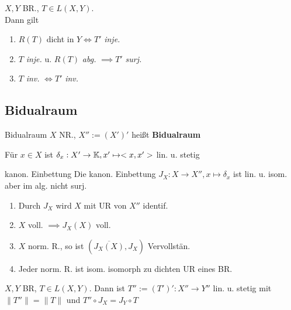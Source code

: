 \begin{bemerkung}
    \(X,Y\) BR., \(T\in L(X,Y)\).\\
    Dann gilt
    \begin{enumerate}[label= (\roman*)]
        \item \(R(T)\) dicht in \(Y \Leftrightarrow T'\) \textit{inje.}
        \item \(T\) \textit{inje.} u. \(R(T)\) \textit{abg.} \(\implies 
            T'\) \textit{surj.}
        \item \(T\) \textit{inv.} \(\Leftrightarrow T'\) \textit{inv.}
    \end{enumerate}
\end{bemerkung}


\subsection{Bidualraum}

\begin{definition}{Bidualraum}
    \(X\) NR., \(X'' := (X')'\) heißt \textbf{Bidualraum}
\end{definition}

\begin{bemerkung}
    Für \(x\in X\) ist \(\delta_x: X' \to \mathbb{K}, x'\mapsto <x,x'>\) lin. u. stetig
\end{bemerkung}

\begin{satz}{kanon. Einbettung}
    Die kanon. Einbettung \(J_X : X\to X'', x\mapsto \delta_x\) ist lin. u.
    isom. aber im alg. nicht surj.
\end{satz}

\begin{bemerkung}
    \begin{enumerate}[label=(\roman*)]
        \item Durch \(J_X\) wird \(X\) mit UR von \(X''\) identif.
        \item \(X\) voll. \(\implies J_X(X)\) voll.
        \item \(X\) norm. R., so ist \((\overline{J_X(X)}, J_X)\) Vervollstän.
        \item Jeder norm. R. ist isom. isomorph zu dichten UR eines BR.
    \end{enumerate}
\end{bemerkung}

\begin{lemma}
    \(X,Y\) BR, \(T\in L(X,Y)\). Dann ist \(T'' := (T')':X''\to Y''\) lin. u.
    stetig mit \(\|T''\| = \|T\|\) und \(T'' \circ J_X = J_Y \circ T \)
\end{lemma}

